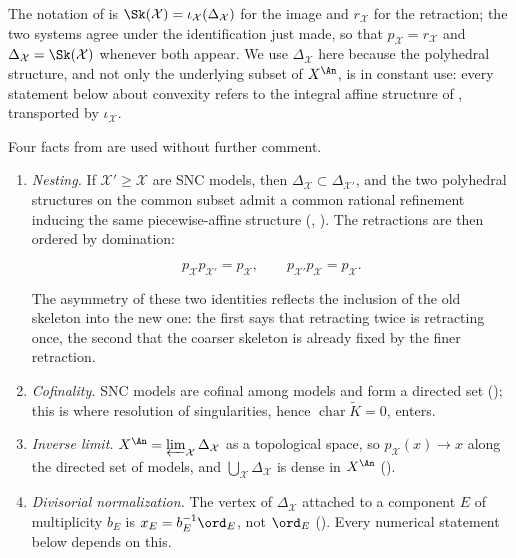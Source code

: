 The notation of  is
$\Sk(\mathcal X)=\iota_{\mathcal X}(\Delta_{\mathcal X})$ for the image
and $r_{\mathcal X}$ for the retraction; the two systems agree under the
identification just made, so that $p_{\mathcal X}=r_{\mathcal X}$ and
$\Delta_{\mathcal X}=\Sk(\mathcal X)$ whenever both appear.  We use
$\Delta_{\mathcal X}$ here because the polyhedral structure, and not only
the underlying subset of $X^{\An}$, is in constant use: every statement
below about convexity refers to the integral affine structure of
, transported by $\iota_{\mathcal X}$.

Four facts from  are used without further comment.

\begin{enumerate}
\item \emph{Nesting.}  If $\mathcal X'\geq\mathcal X$ are SNC models, then
$\Delta_{\mathcal X}\subset\Delta_{\mathcal X'}$, and the two
polyhedral structures on the common subset admit a common rational
refinement inducing the same piecewise-affine structure
(, ).
The retractions are then ordered by domination:

\begin{equation}
\label{eq:ch21-retraction-composition}
 p_{\mathcal X}p_{\mathcal X'}=p_{\mathcal X},
 \qquad
 p_{\mathcal X'}p_{\mathcal X}=p_{\mathcal X}.
\end{equation}

The asymmetry of these two identities reflects the inclusion of the old
skeleton into the new one: the first says that retracting twice is
retracting once, the second that the coarser skeleton is already fixed by
the finer retraction.
\item \emph{Cofinality.}  SNC models are cofinal among models and form a
directed set (); this is where resolution of
singularities, hence $\operatorname{char}\widetilde K=0$, enters.
\item \emph{Inverse limit.}  $X^{\An}=\varprojlim_{\mathcal X}
\Delta_{\mathcal X}$ as a topological space, so
$p_{\mathcal X}(x)\to x$ along the directed set of models, and
$\bigcup_{\mathcal X}\Delta_{\mathcal X}$ is dense in $X^{\An}$
().
\item \emph{Divisorial normalization.}  The vertex of
$\Delta_{\mathcal X}$ attached to a component $E$ of multiplicity
$b_E$ is $x_E=b_E^{-1}\ord_E$, not $\ord_E$
().  Every numerical statement below
depends on this.
\end{enumerate}

